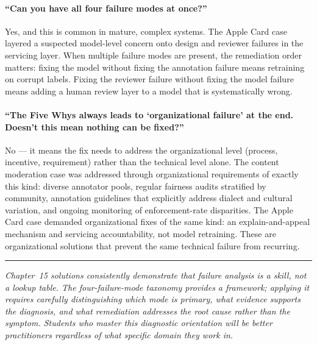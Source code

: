 \paragraph{``Can you have all four failure modes at once?''}
Yes, and this is common in mature, complex systems. The Apple Card case layered a suspected model-level concern onto design and reviewer failures in the servicing layer. When multiple failure modes are present, the remediation order matters: fixing the model without fixing the annotation failure means retraining on corrupt labels. Fixing the reviewer failure without fixing the model failure means adding a human review layer to a model that is systematically wrong.

\paragraph{``The Five Whys always leads to `organizational failure' at the end. Doesn't this mean nothing can be fixed?''}
No --- it means the fix needs to address the organizational level (process, incentive, requirement) rather than the technical level alone. The content moderation case was addressed through organizational requirements of exactly this kind: diverse annotator pools, regular fairness audits stratified by community, annotation guidelines that explicitly address dialect and cultural variation, and ongoing monitoring of enforcement-rate disparities. The Apple Card case demanded organizational fixes of the same kind: an explain-and-appeal mechanism and servicing accountability, not model retraining. These are organizational solutions that prevent the same technical failure from recurring.

\bigskip
\begin{center}
\rule{0.5\textwidth}{0.4pt}
\end{center}
\bigskip

\noindent\textit{Chapter~15 solutions consistently demonstrate that failure analysis is a skill, not a lookup table. The four-failure-mode taxonomy provides a framework; applying it requires carefully distinguishing which mode is primary, what evidence supports the diagnosis, and what remediation addresses the root cause rather than the symptom. Students who master this diagnostic orientation will be better practitioners regardless of what specific domain they work in.}
